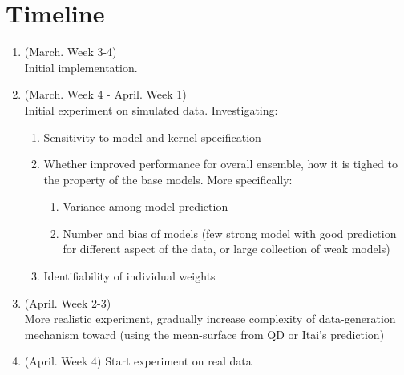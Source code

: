 \documentclass[11pt]{article}
\theoremstyle{definition}
\begin{document}
\section{\textbf{Timeline}}
\begin{enumerate}
\item (March. Week 3-4) \\
Initial implementation. 
\item (March. Week 4 - April. Week 1) \\
Initial experiment on simulated data.
Investigating:
\begin{enumerate}
\item Sensitivity to model and kernel specification
\item Whether improved performance for overall ensemble, how it is tighed to the property of the base models. More specifically:
\begin{enumerate}
\item Variance among model prediction
\item Number and bias of models (few strong model with good prediction for different aspect of the data, or large collection of weak models)
\end{enumerate}
\item Identifiability of individual weights
\end{enumerate} 
\item (April. Week 2-3) \\
More realistic experiment, gradually increase complexity of data-generation mechanism toward (using the mean-surface from QD or Itai's prediction)
\item (April. Week 4) Start experiment on real data
\end{enumerate}


\clearpage

\end{document}
